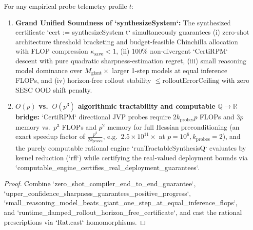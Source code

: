 \begin{lemma}\label{lem:executable_computable_synthesis}
\leanok
{}
For any empirical probe telemetry profile $t$:
\begin{enumerate}
\item \textbf{Grand Unified Soundness of `synthesizeSystem`:} The synthesized certificate `cert := synthesizeSystem t` simultaneously guarantees (i) zero-shot architecture threshold bracketing and budget-feasible Chinchilla allocation with FLOP compression $\kappa_{\mathrm{save}} < 1$, (ii) 100\% non-divergent `CertiRPM` descent with pure quadratic sharpness-estimation regret, (iii) small reasoning model dominance over $M_{\mathrm{giant}}\times$ larger 1-step models at equal inference FLOPs, and (iv) horizon-free rollout stability $\le \mathrm{rolloutErrorCeiling}$ with zero $\mathrm{SESC}$ OOD shift penalty.
\item \textbf{$O(p)$ vs.\ $O(p^3)$ algorithmic tractability and computable $\mathbb{Q} \to \mathbb{R}$ bridge:} `CertiRPM` directional JVP probes require $2k_{\mathrm{probes}}p$ FLOPs and $3p$ memory vs.\ $p^3$ FLOPs and $p^2$ memory for full Hessian preconditioning (an exact speedup factor of $\frac{p^2}{2k_{\mathrm{probes}}}$, e.g.\ $2.5\times 10^{11}\times$ at $p=10^6, k_{\mathrm{probes}}=2$), and the purely computable rational engine `runTractableSynthesisQ` evaluates by kernel reduction (`rfl`) while certifying the real-valued deployment bounds via `computable_engine_certifies_real_deployment_guarantees`.
\end{enumerate}
\end{lemma}
\begin{proof}
\leanok
Combine `zero_shot_compiler_end_to_end_guarantee`, `upper_confidence_sharpness_guarantees_positive_progress`, `small_reasoning_model_beats_giant_one_step_at_equal_inference_flops`, and `runtime_damped_rollout_horizon_free_certificate`, and cast the rational prescriptions via `Rat.cast` homomorphisms.
\end{proof}



